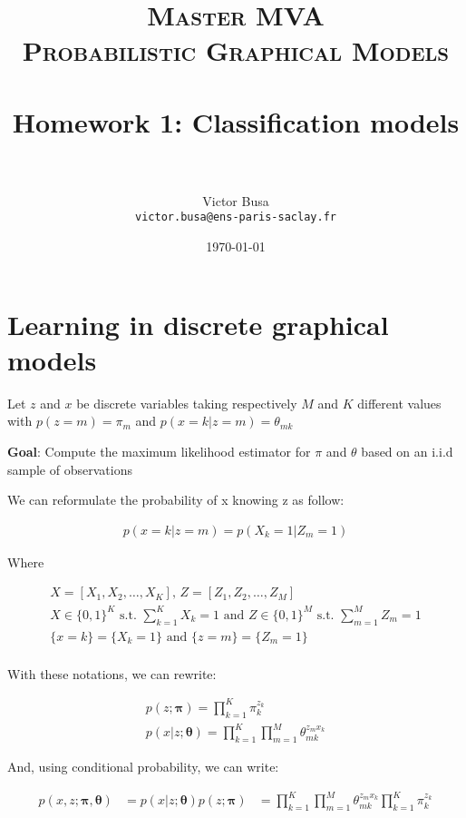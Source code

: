 \documentclass[11pt]{article}
\title{	
\normalfont \normalsize 
\textsc{Master MVA \\
Probabilistic Graphical Models} \\ [20pt]
\horrule{0.5pt} \\[0.2cm] %
\textbf{Homework 1}: Classification models \\
\horrule{2pt} \\[0.3cm] %
}
\author{Victor Busa \\
   \texttt{victor.busa@ens-paris-saclay.fr}}
\date{\normalsize\today}
\numberwithin{figure}{section} %
\begin{document}
\maketitle

\section{Learning in discrete graphical models}

Let $z$ and $x$ be discrete variables taking respectively $M$ and $K$ different values with $p(z=m) = \pi_m$ and $p(x=k|z=m) = \theta_{mk}$

\textbf{Goal}: Compute the maximum likelihood estimator for $\pi$ and $\theta$ based on an i.i.d sample of observations

We can reformulate the probability of x knowing z as follow:

\begin{align*}
p(x=k|z=m) = p(X_k = 1 | Z_m = 1)
\end{align*}

Where

\begin{align*}
X = [X_1, X_2, \hdots , X_K] \text{, } Z = [Z_1, Z_2, \hdots , Z_M]\\
X \in \{0,1\}^{K} \text{ s.t. } \sum\limits_{k=1}^K X_k = 1 \text{ and } Z \in \{0,1\}^{M} \text{ s.t. } \sum\limits_{m=1}^M Z_m = 1 \\
\{x = k\} = \{X_k = 1\} \text{ and } \{z = m\} = \{Z_m = 1\} \\
\end{align*}

With these notations, we can rewrite:

\begin{align*}
p(z; \boldsymbol{\pi}) = \prod\limits_{k=1}^K \pi_k^{z_k} \\
p(x | z; \boldsymbol{\theta}) = \prod\limits_{k=1}^K \prod\limits_{m=1}^M \theta_{mk}^{z_m x_k}
\end{align*}

And, using conditional probability, we can write:

\begin{equation*}
\begin{aligned}
p(x, z; \boldsymbol{\pi}, \boldsymbol{\theta}) & = p(x | z; \boldsymbol{\theta})p(z; \boldsymbol{\pi})
& = \prod\limits_{k=1}^K \prod\limits_{m=1}^M \theta_{mk}^{z_m x_k} \prod\limits_{k=1}^K \pi_k^{z_k}
\end{aligned}
\end{equation*}
\end{document}
